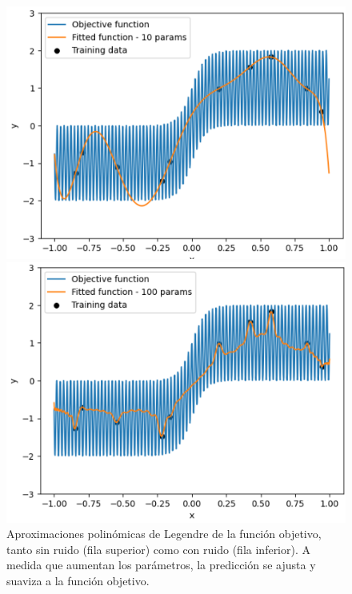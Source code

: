 \begin{figure}[h]
\begin{minipage}{0.32\textwidth}
        \centering
        \includegraphics[width=\linewidth]{img/experiments/hiperbolica_noise1.2.png}
    \end{minipage}
    \begin{minipage}{0.32\textwidth}
        \centering
        \includegraphics[width=\linewidth]{img/experiments/hiperbolica_noise1.3.png}
    \end{minipage}
    \caption[Aproximaciones polinómicas de Legendre de la función objetivo, tanto sin ruido como con ruido.]{Aproximaciones polinómicas de Legendre de la función objetivo, tanto sin ruido (fila superior) como con ruido (fila inferior). A medida que aumentan los parámetros, la predicción se ajusta y suaviza a la función objetivo.}\label{fig:approx-hiperbolicas}
\end{figure}

